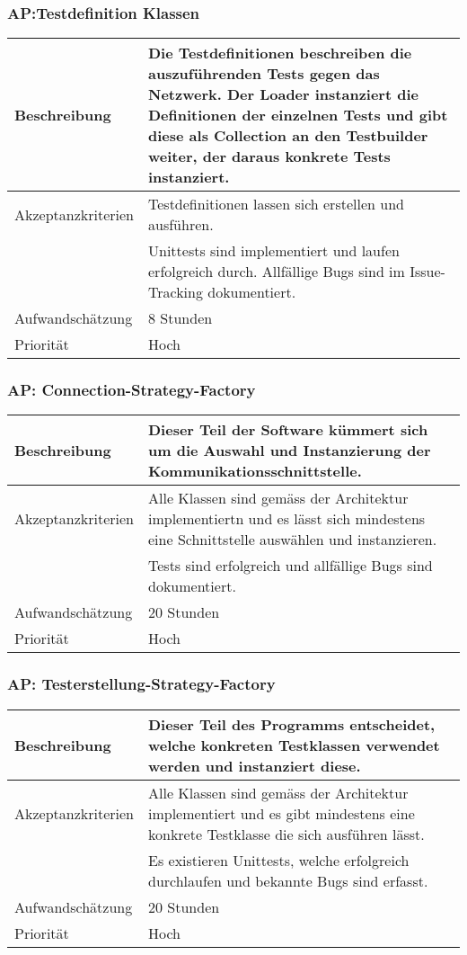 \documentclass[
	ngerman,
	toc=listof, %
	toc=bibliography, %
	footnotes=multiple, %
	parskip=half, %
	numbers=noendperiod %
]{scrartcl}
\begin{document}
	\subsubsection{AP:Testdefinition Klassen}
	\begin{tabularx}{\textwidth}{lX}
		\toprule
		Beschreibung & Die Testdefinitionen beschreiben die auszuführenden Tests gegen das Netzwerk. Der Loader instanziert die Definitionen der einzelnen Tests und gibt diese als Collection an den Testbuilder weiter, der daraus konkrete Tests instanziert.\\
		\midrule
		Akzeptanzkriterien & Testdefinitionen lassen sich erstellen und ausführen.\\
		 & Unittests sind implementiert und laufen erfolgreich durch. Allfällige Bugs sind im Issue-Tracking dokumentiert.\\
		\midrule
		Aufwandschätzung & 8 Stunden\\
		\midrule
		Priorität & Hoch\\
		\bottomrule
	\end{tabularx}

	\subsubsection{AP: Connection-Strategy-Factory}
	\begin{tabularx}{\textwidth}{lX}
		\toprule
		Beschreibung & Dieser Teil der Software kümmert sich um die Auswahl und Instanzierung der Kommunikationsschnittstelle.\\
		\midrule
		Akzeptanzkriterien & Alle Klassen sind gemäss der Architektur implementiertn und es lässt sich mindestens eine Schnittstelle auswählen und instanzieren.\\
		 & Tests sind erfolgreich und allfällige Bugs sind dokumentiert.\\
		\midrule
		Aufwandschätzung & 20 Stunden\\
		\midrule
		Priorität & Hoch\\
		\bottomrule
	\end{tabularx}

	\subsubsection{AP: Testerstellung-Strategy-Factory}
	\begin{tabularx}{\textwidth}{lX}
		\toprule
		Beschreibung & Dieser Teil des Programms entscheidet, welche konkreten Testklassen verwendet werden und instanziert diese.\\
		\midrule
		Akzeptanzkriterien & Alle Klassen sind gemäss der Architektur implementiert und es gibt mindestens eine konkrete Testklasse die sich ausführen lässt. \\
		 & Es existieren Unittests, welche erfolgreich durchlaufen und bekannte Bugs sind erfasst.\\
		\midrule
		Aufwandschätzung & 20 Stunden\\
		\midrule
		Priorität & Hoch\\
		\bottomrule
	\end{tabularx}
	\newpage
\end{document}
